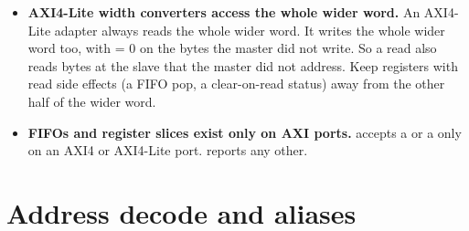 \begin{itemize}
  An unaligned access from an AXI4-Lite master behaves differently on an 8-bit and a
  16-bit APB bus. Onto 8 bits, the bridge accesses the bytes from the address to the end
  of the beat, and not the bytes below the address. Onto 16 bits, it accesses the whole
  aligned word. Both are legal AXI. What you can do: use aligned accesses to narrow APB
  slaves.
\item \textbf{AXI4-Lite width converters access the whole wider word.} An AXI4-Lite
   adapter always reads the whole wider word. It writes the whole wider word too,
  with  = 0 on the bytes the master did not write. So a read also reads
  bytes at the slave that the master did not address. Keep registers with read side effects (a FIFO pop, a clear-on-read
  status) away from the other half of the wider word.
\item \textbf{FIFOs and register slices exist only on AXI ports.} 
  accepts a  or a  only on an AXI4 or AXI4-Lite port.
   reports any other.
\end{itemize}

\section{Address decode and aliases}

